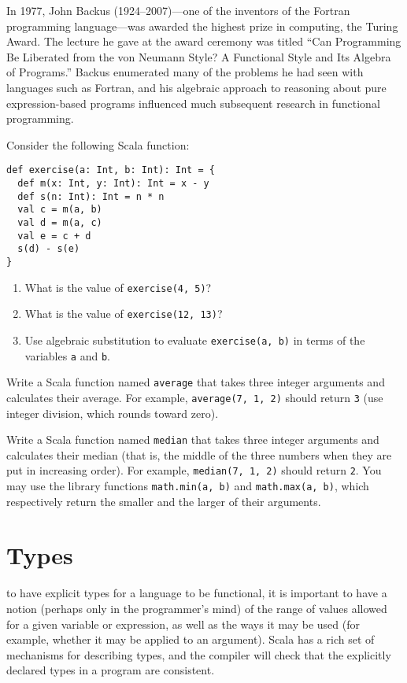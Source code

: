 \begin{tailquote}
In 1977, John Backus (1924--2007)---one of the inventors of the Fortran programming language---was awarded the highest prize in computing, the Turing Award. The lecture he gave at the award ceremony was titled ``Can Programming Be Liberated from the von Neumann Style? A Functional Style and Its Algebra of Programs.'' Backus enumerated many of the problems he had seen with languages such as Fortran, and his algebraic approach to reasoning about pure expression-based programs influenced much subsequent research in functional programming.
\end{tailquote}
\begin{exercises}
\item Consider the following Scala function:
\begin{verbatim}
def exercise(a: Int, b: Int): Int = {
  def m(x: Int, y: Int): Int = x - y
  def s(n: Int): Int = n * n
  val c = m(a, b)
  val d = m(a, c)
  val e = c + d
  s(d) - s(e)
}
\end{verbatim}
\begin{enumerate}
\item What is the value of \verb|exercise(4, 5)|?
\item What is the value of \verb|exercise(12, 13)|?
\item Use algebraic substitution to evaluate \verb|exercise(a, b)| in terms of the variables \verb|a| and \verb|b|.
\end{enumerate}

\item Write a Scala function named \verb|average| that takes three integer arguments and calculates their average. For example, \verb|average(7, 1, 2)| should return \verb|3| (use integer division, which rounds toward zero).

\item Write a Scala function named \verb|median| that takes three integer arguments and calculates their median (that is, the middle of the three numbers when they are put in increasing order). For example, \verb|median(7, 1, 2)| should return \verb|2|. You may use the library functions \verb|math.min(a, b)| and \verb|math.max(a, b)|, which respectively return the smaller and the larger of their arguments.
\end{exercises}

\section{Types}
 to have explicit types for a language to be functional, it is important to have a notion (perhaps only in the programmer's mind) of the range of values allowed for a given variable or expression, as well as the ways it may be used (for example, whether it may be applied to an argument). Scala has a rich set of mechanisms for describing types, and the compiler will check that the explicitly declared types in a program are consistent.

